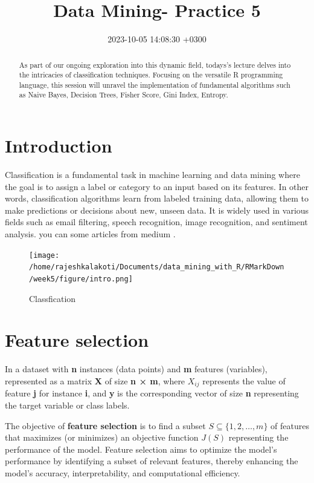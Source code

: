 \documentclass[a4paper,conference]{IEEEtran}
\title{Data Mining- Practice 5}
\author{\IEEEauthorblockN{%
  Rajesh Kalakoti\IEEEauthorrefmark{4}%
  , Sven Nomm\IEEEauthorrefmark{1}%
}
\IEEEauthorblockA{\IEEEauthorrefmark{1}
      Taltech, Estonia, 12616}
\IEEEauthorblockA{\IEEEauthorrefmark{4}
      Email:
\href{mailto:rajesh.kalakoti@outlook.com}{\nolinkurl{rajesh.kalakoti@outlook.com}}}
}
\date{2023-10-05 14:08:30 +0300}
\let\citep\cite
\begin{document}
\maketitle
\begin{abstract}
As part of our ongoing exploration into this dynamic field, todays's
lecture delves into the intricacies of classification techniques.
Focusing on the versatile R programming language, this session will
unravel the implementation of fundamental algorithms such as Naive
Bayes, Decision Trees, Fisher Score, Gini Index, Entropy.
\end{abstract}

\hypertarget{sec:introduction}{%
\section{Introduction}\label{sec:introduction}}

Classification is a fundamental task in machine learning and data mining
where the goal is to assign a label or category to an input based on its
features. In other words, classification algorithms learn from labeled
training data, allowing them to make predictions or decisions about new,
unseen data. It is widely used in various fields such as email
filtering, speech recognition, image recognition, and sentiment
analysis. you can some articles from medium
\citep{Classifi72:online, Introtot39:online, Lecture045:online}.

\begin{figure}
\centering
\texttt{[image: /home/rajeshkalakoti/Documents/data\_mining\_with\_R/RMarkDown/week5/figure/intro.png]}
\caption{Classfication}
\end{figure}

\hypertarget{sec:feature-selection}{%
\section{Feature selection}\label{sec:feature-selection}}

In a dataset with \textbf{n} instances (data points) and \textbf{m}
features (variables), represented as a matrix \textbf{X} of size
\textbf{n × m}, where \(X_{ij}\) represents the value of feature
\textbf{j} for instance \textbf{i}, and \textbf{y} is the corresponding
vector of size \textbf{n} representing the target variable or class
labels.

The objective of \textbf{feature selection} is to find a subset
\(S \subseteq \{1, 2, \ldots, m\}\) of features that maximizes (or
minimizes) an objective function \(J(S)\) representing the performance
of the model. Feature selection aims to optimize the model's performance
by identifying a subset of relevant features, thereby enhancing the
model's accuracy, interpretability, and computational efficiency.
\end{document}
